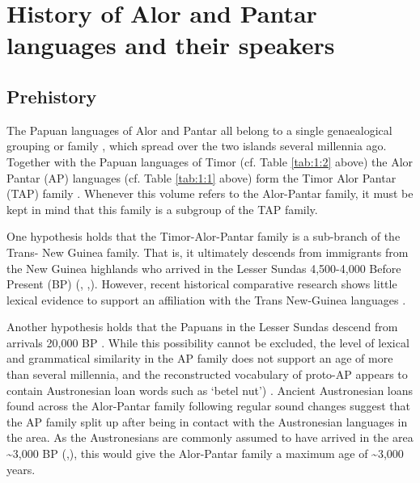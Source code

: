 \section{History of Alor and Pantar languages and their speakers}\label{sec:1:4}

\subsection{Prehistory}\label{sec:1:4.1}
The Papuan languages of Alor and Pantar all belong to a single genaealogical grouping or family \citep{HoltonEtAl2012,HoltonEtAlthisvolumea}, which spread over the two islands several millennia ago. Together with the Papuan languages of Timor (cf. Table \ref{tab:1:2} above) the Alor Pantar (AP) languages (cf. Table \ref{tab:1:1} above) form the Timor Alor Pantar (TAP) family \citep{SchapperEtAlTV}. Whenever this volume refers to the Alor-Pantar family, it must be kept in mind that this family is a subgroup of the TAP family. 

One hypothesis holds that the Timor-Alor-Pantar family is a sub-branch of the Trans- New Guinea family. That is, it ultimately descends from immigrants from the New Guinea highlands who arrived in the Lesser Sundas 4,500-4,000 Before Present (BP) (\citealt[123]{Bellwood1997}, \citealt[42]{Ross2005},\citealt{Pawley2005}). However, recent historical comparative research \citep{RobinsonEtAl2012internal,HoltonEtAlthisvolumeb} shows little lexical evidence to support an affiliation with the Trans New-Guinea languages \citep[cf.][]{WurmEtAl1975,Ross2005}.

Another hypothesis holds that the Papuans in the Lesser Sundas descend from arrivals 20,000 BP \citep{Summerhayes2007}. While this possibility cannot be excluded, the level of lexical and grammatical similarity in the AP family does not support an age of more than several millennia, and the reconstructed vocabulary of proto-AP appears to contain Austronesian loan words such as  `betel nut') \citep{HoltonEtAl2012,Robinsontaalorpantar}. Ancient Austronesian loans found across the Alor-Pantar family following regular sound changes suggest that the AP family split up after being in contact with the Austronesian languages in the area. As the Austronesians are commonly assumed to have arrived in the area \~{}3,000 BP (\citealt[100]{Pawley2005},\citealt{Spriggs2011}), this would give the Alor-Pantar family a maximum age of \~{}3,000 years.

